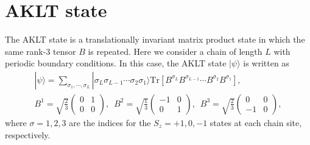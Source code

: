 \documentclass[11pt,a4paper,oneside]{article}
\begin{document}
\section*{AKLT state}

The AKLT state is a translationally invariant matrix product state in which the same rank-3 tensor $B$ is repeated.
Here we consider a chain of  length $L$ with periodic boundary conditions.
In this case, the AKLT state $| \psi \rangle$ is written as
\begin{equation}
\begin{gathered}
| \psi \rangle = \sum_{\sigma_1, \cdots, \sigma_L} | \sigma_L \sigma_{L-1} \cdots \sigma_{2} \sigma_{1} \rangle
\mathrm{Tr} [ B^{\sigma_L} B^{\sigma_{L-1}} \cdots B^{\sigma_{2}} B^{\sigma_{1}} ],
\\
B^1 = \sqrt{\frac{2}{3}}
\begin{pmatrix}
0 & 1 \\ 0 & 0
\end{pmatrix},
\,\,\,
B^2 = \sqrt{\frac{1}{3}}
\begin{pmatrix}
-1 & 0 \\ 0 & 1
\end{pmatrix},
\,\,\,
B^3 = \sqrt{\frac{2}{3}}
\begin{pmatrix}
0 & 0 \\ -1 & 0
\end{pmatrix},
\end{gathered}
\end{equation}
where $\sigma = 1, 2, 3$ are the indices for the $S_z = +1, 0, -1$ states at each chain site, respectively.
\end{document}
